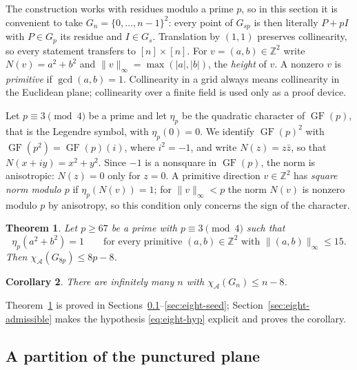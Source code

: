 \documentclass[11pt]{article}
\newtheorem{theorem}{Theorem}
\newtheorem{corollary}[theorem]{Corollary}
\theoremstyle{definition}
\theoremstyle{remark}
\newcommand{\GF}{\operatorname{GF}}
\newcommand{\Z}{\mathbb{Z}}
\newcommand{\qc}{\eta_p}
\newcommand{\height}[1]{\lVert #1\rVert_\infty}
\renewcommand{\ge}{\geqslant}
\renewcommand{\le}{\leqslant}
\begin{document}
The construction works with residues modulo a prime \(p\), so in this
section it is convenient to take \(G_n=\{0,\ldots,n-1\}^2\): every point
of \(G_{sp}\) is then literally \(P+pI\) with \(P\in G_p\) its residue
and \(I\in G_s\).  Translation by \((1,1)\) preserves collinearity, so
every statement transfers to \([n]\times[n]\).  For \(v=(a,b)\in\Z^2\)
write \(N(v)=a^2+b^2\) and \(\height{v}=\max(|a|,|b|)\), the
\emph{height} of \(v\). A nonzero \(v\) is \emph{primitive} if
\(\gcd(a,b)=1\).  Collinearity in a grid always means collinearity in the
Euclidean plane; collinearity over a finite field is used only as a proof
device.

Let \(p\equiv3\pmod4\) be a prime and let \(\qc\) be the quadratic
character of \(\GF(p)\), that is the Legendre symbol, with \(\qc(0)=0\).
We identify \(\GF(p)^2\) with \(\GF(p^2)=\GF(p)(i)\), where \(i^2=-1\),
and write \(N(z)=z\bar z\), so that \(N(x+iy)=x^2+y^2\).  Since \(-1\) is
a nonsquare in \(\GF(p)\), the norm is anisotropic: \(N(z)=0\) only for
\(z=0\).  A primitive direction \(v\in\Z^2\) has \emph{square norm
modulo \(p\)} if \(\qc(N(v))=1\); for \(\height{v}<p\) the norm \(N(v)\)
is nonzero modulo \(p\) by anisotropy, so this condition only concerns
the sign of the character.

\begin{theorem}\label{thm:eight-saving}
Let \(p\ge67\) be a prime with \(p\equiv3\pmod4\) such that
\begin{equation}\label{eq:eight-hyp}
  \qc(a^2+b^2)=1
  \qquad\text{for every primitive \((a,b)\in\Z^2\) with
  \(\height{(a,b)}\le15\)}.
\end{equation}
Then \(\chi_{\mathcal{A}}(G_{8p})\le 8p-8\).
\end{theorem}

\begin{corollary}\label{cor:eight-saving}
There are infinitely many \(n\) with \(\chi_{\mathcal{A}}(G_n)\le n-8\).
\end{corollary}

Theorem~\ref{thm:eight-saving} is proved in
Sections~\ref{sec:field-partition}--\ref{sec:eight-seed};
Section~\ref{sec:eight-admissible} makes the hypothesis
\eqref{eq:eight-hyp} explicit and proves the corollary.

\subsection{A partition of the punctured plane}
\label{sec:field-partition}
\end{document}
